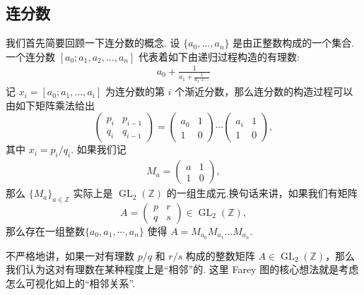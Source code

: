 \documentclass[10pt,UTF8]{ctexart}
\newcommand{\Z}{\mathbb{Z}}
\newcommand{\GL}{\operatorname{GL}_2(\Z)}
\theoremstyle{definition}
\theoremstyle{remark}
\begin{document}
\subsection{连分数}
我们首先简要回顾一下连分数的概念. 设 $\{a_0,\dots,a_n\}$ 是由正整数构成的一个集合.一个连分数 $[a_0; a_1, a_2, \dots, a_n]$ 代表着如下由递归过程构造的有理数:
\begin{align*}
    a_0 + \frac{1}{a_1 + \frac{1}{a_2 + \dots}}
\end{align*}
记 $x_{i}=[a_0;a_1,\dots,a_i]$ 为连分数的第 $i$ 个渐近分数，那么连分数的构造过程可以由如下矩阵乘法给出
$$\begin{pmatrix} p_i & p_{i-1} \\ q_i & q_{i-1} \end{pmatrix} = \begin{pmatrix} a_0 & 1 \\ 1 & 0 \end{pmatrix} \cdots \begin{pmatrix} a_i & 1 \\ 1 & 0 \end{pmatrix},$$
其中 $x_i = p_i/q_i$.  如果我们记 
\begin{align*}
    M_a = \begin{pmatrix} a & 1 \\ 1 & 0 \end{pmatrix},
\end{align*}
那么 $\{M_a\}_{a\in\Z}$ 实际上是 $\GL$ 的一组生成元.换句话来讲，如果我们有矩阵 
$$A = \begin{pmatrix} p & r \\ q & s \end{pmatrix} \in \GL,$$
那么存在一组整数$\{a_0,a_1,\cdots,a_n\}$ 使得 $A = M_{a_0}M_{a_1}\dots M_{a_n}.$ 

不严格地讲，如果一对有理数 $p/q$ 和 $r/s$ 构成的整数矩阵 $A\in \GL$，那么我们认为这对有理数在某种程度上是“相邻”的. 这里 Farey 图的核心想法就是考虑怎么可视化如上的“相邻关系”.
\end{document}
